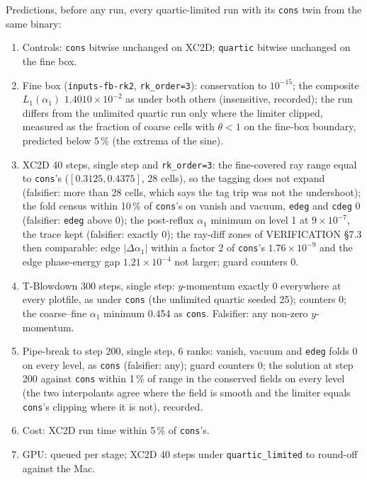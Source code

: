 \documentclass[11pt,a4paper]{article}
\newcommand{\code}[1]{\texttt{\small #1}}
\begin{document}
Predictions, before any run, every quartic-limited run with its
\code{cons} twin from the same binary:
\begin{enumerate}[nosep]
\item Controls: \code{cons} bitwise unchanged on XC2D; \code{quartic}
      bitwise unchanged on the fine box.
\item Fine box (\code{inputs-fb-rk2}, \code{rk\_order=3}): conservation to
      $10^{-15}$; the composite $L_1(\alpha_1)$ $1.4010\times10^{-2}$ as
      under both others (insensitive, recorded); the run differs from the
      unlimited quartic run only where the limiter clipped, measured as
      the fraction of coarse cells with $\theta<1$ on the fine-box
      boundary, predicted below 5\,\% (the extrema of the sine).
\item XC2D 40 steps, single step and \code{rk\_order=3}: the fine-covered
      ray range equal to \code{cons}'s ($[0.3125, 0.4375]$, 28 cells), so
      the tagging does not expand (falsifier: more than 28 cells, which
      says the tag trip was not the undershoot); the fold census within
      10\,\% of \code{cons}'s on vanish and vacuum, \code{edeg} and
      \code{cdeg} 0 (falsifier: \code{edeg} above 0); the post-reflux
      $\alpha_1$ minimum on level 1 at $9\times10^{-7}$, the trace kept
      (falsifier: exactly 0); the ray-diff zones of VERIFICATION \S7.3
      then comparable: edge $|\Delta\alpha_1|$ within a factor 2 of
      \code{cons}'s $1.76\times10^{-9}$ and the edge phase-energy gap
      $1.21\times10^{-4}$ not larger; guard counters 0.
\item T-Blowdown 300 steps, single step: $y$-momentum exactly 0
      everywhere at every plotfile, as under \code{cons} (the unlimited
      quartic seeded 25); counters 0; the coarse--fine $\alpha_1$ minimum
      0.454 as \code{cons}.  Falsifier: any non-zero $y$-momentum.
\item Pipe-break to step 200, single step, 6 ranks: vanish, vacuum and
      \code{edeg} folds 0 on every level, as \code{cons} (falsifier: any);
      guard counters 0; the solution at step 200 against \code{cons}
      within 1\,\% of range in the conserved fields on every level (the
      two interpolants agree where the field is smooth and the limiter
      equals \code{cons}'s clipping where it is not), recorded.
\item Cost: XC2D run time within 5\,\% of \code{cons}'s.
\item GPU: queued per stage; XC2D 40 steps under \code{quartic\_limited}
      to round-off against the Mac.
\end{enumerate}
\end{document}
